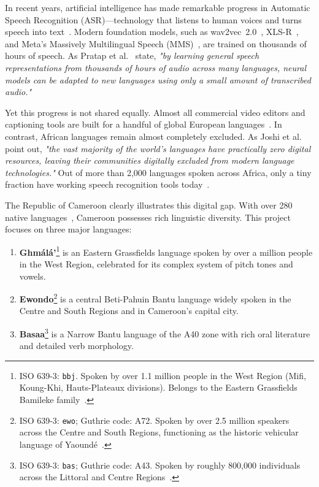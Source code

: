 \documentclass[a4paper,11pt]{article}
\begin{document}
In recent years, artificial intelligence has made remarkable progress in Automatic Speech Recognition (ASR)—technology that listens to human voices and turns speech into text~\cite{amodei2016deep, dong2018speech}. Modern foundation models, such as wav2vec~2.0~\cite{baevski2020wav2vec}, XLS-R~\cite{babu2022xlsr}, and Meta's Massively Multilingual Speech (MMS)~\cite{pratap2024scaling}, are trained on thousands of hours of speech. As Pratap et al.~\cite{pratap2024scaling} state, \textit{"by learning general speech representations from thousands of hours of audio across many languages, neural models can be adapted to new languages using only a small amount of transcribed audio."}

Yet this progress is not shared equally. Almost all commercial video editors and captioning tools are built for a handful of global European languages~\cite{joshi2020state}. In contrast, African languages remain almost completely excluded. As Joshi et al.~\cite{joshi2020state} point out, \textit{"the vast majority of the world's languages have practically zero digital resources, leaving their communities digitally excluded from modern language technologies."} Out of more than 2,000 languages spoken across Africa, only a tiny fraction have working speech recognition tools today~\cite{eberhard2021ethnologue, nekoto2020participatory}.

The Republic of Cameroon clearly illustrates this digital gap. With over 280 native languages~\cite{lewis2009ethnologue, eberhard2021ethnologue}, Cameroon possesses rich linguistic diversity. This project focuses on three major languages:
\begin{enumerate}
    \item \textbf{Gh\textopeno m\'al\'a'}\footnote{ISO 639-3: \texttt{bbj}. Spoken by over 1.1 million people in the West Region (Mifi, Koung-Khi, Hauts-Plateaux divisions). Belongs to the Eastern Grassfields Bamileke family~\cite{watters2007bamileke}.} is an Eastern Grassfields language spoken by over a million people in the West Region, celebrated for its complex system of pitch tones and vowels.
    \item \textbf{Ewondo}\footnote{ISO 639-3: \texttt{ewo}; Guthrie code: A72. Spoken by over 2.5 million speakers across the Centre and South Regions, functioning as the historic vehicular language of Yaound\'e~\cite{essono2010ewondo}.} is a central Beti-Pahuin Bantu language widely spoken in the Centre and South Regions and in Cameroon's capital city.
    \item \textbf{Basaa}\footnote{ISO 639-3: \texttt{bas}; Guthrie code: A43. Spoken by roughly 800,000 individuals across the Littoral and Centre Regions~\cite{njiki2015grammaire, bitjaa2017dialectologie}.} is a Narrow Bantu language of the A40 zone with rich oral literature and detailed verb morphology.
\end{enumerate}
\end{document}
